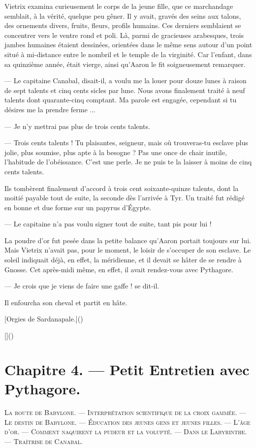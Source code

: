 \documentclass[a4paper, 11pt, oneside, polutonikogreek, french]{article}
\begin{document}
Vietrix examina curieusement le corps de la jeune fille, que ce marchandage semblait, à la vérité, quelque peu gêner. Il y avait, gravés des seins aux talons, des ornements divers, fruits, fleurs, profils humains. Ces derniers semblaient se concentrer vers le ventre rond et poli. Là, parmi de gracieuses arabesques, trois jambes humaines étaient dessinées, orientées dans le même sens autour d'un point situé à mi-distance entre le nombril et le temple de la virginité. Car l'enfant, dans sa quinzième année, était vierge, ainsi qu'Aaron le fit soigneusement remarquer.

--- Le capitaine Canabal, disait-il, a voulu me la louer pour douze lunes à raison de sept talents et cinq cents sicles par lune. Nous avons finalement traité à neuf talents dont quarante-cinq comptant. Ma parole est engagée, cependant si tu désires me la prendre ferme ...

--- Je n'y mettrai pas plus de trois cents talents.

--- Trois cents talents ! Tu plaisantes, seigneur, mais où trouveras-tu esclave plus jolie, plus soumise, plus apte à la besogne ? Pas une once de chair inutile, l'habitude de l'obéissance. C'est une perle. Je ne puis te la laisser à moins de cinq cents talents.

Ils tombèrent finalement d'accord à trois cent soixante-quinze talents, dont la moitié payable tout de suite, la seconde dès l'arrivée à Tyr. Un traité fut rédigé en bonne et due forme sur un papyrus d'Égypte.

--- Le capitaine n'a pas voulu signer tout de suite, tant pis pour lui !

La poudre d'or fut pesée dans la petite balance qu'Aaron portait toujours sur lui. Mais Vietrix n'avait pas, pour le moment, le loisir de s'occuper de son esclave. Le soleil indiquait déjà, en effet, la méridienne, et il devait se hâter de se rendre à Gnosse. Cet après-midi même, en effet, il avait rendez-vous avec Pythagore.

--- Je crois que je viens de faire une gaffe ! se dit-il.

Il enfourcha son cheval et partit en hâte.

[Orgies de Sardanapale.]()

[]()
\clearpage
\section{Chapitre 4. --- Petit Entretien avec Pythagore.}
\begin{center}
\scshape
\small
La route de Babylone. --- Interprétation scientifique de la croix gammée. --- Le destin de Babylone. --- Éducation des jeunes gens et jeunes filles. --- L'âge d'or. --- Comment naquirent la pudeur et la volupté. --- Dans le Labyrinthe. --- Traîtrise de Canabal.
\end{center}
\end{document}
